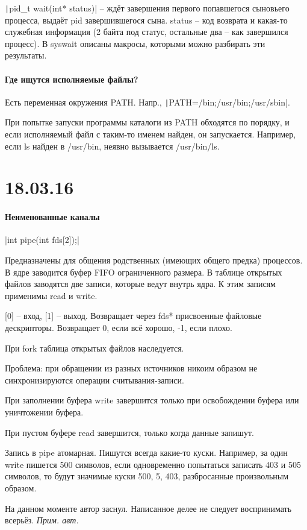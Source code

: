 \documentclass[a4paper,10pt]{article}
\newcommand{\cl}{\mint{c}}
\newcommand{\bash}{\texttt}
\begin{document}
\texttt|pid_t wait(int* status)| -- ждёт завершения первого попавшегося сыновьего процесса, выдаёт pid завершившегося сына. status -- код возврата и какая-то служебная информация (2 байта под статус, остальные два -- как завершился процесс). В syswait описаны макросы, которыми можно разбирать эти результаты.

\paragraph{Где ищутся исполняемые файлы?}
Есть переменная окружения PATH. Напр., \bash|PATH=/bin;/usr/bin;/usr/sbin|. 

При попытке запуски программы каталоги из PATH обходятся по порядку, и если исполняемый файл с таким-то именем найден, он запускается. 
Например, если ls найден в /usr/bin, неявно вызывается /usr/bin/ls.

\section{18.03.16}
\paragraph{Неименованные каналы}
\cl|int pipe(int fds[2]);|

Предназначены для общения родственных (имеющих общего предка) процессов.
В ядре заводится буфер FIFO ограниченного размера. В таблице открытых файлов заводятся две записи, которые ведут внутрь ядра. К этим записям применимы read и write.

[0] -- вход, [1] -- выход. Возвращает через fds* присвоенные файловые дескрипторы. Возвращает 0, если всё хорошо, -1, если плохо.

При fork таблица открытых файлов наследуется.

Проблема: при обращении из разных источников никоим образом не синхронизируются операции считывания-записи.

При заполнении буфера write завершится только при освобождении буфера или уничтожении буфера.

При пустом буфере read завершится, только когда данные запишут.

Запись в pipe атомарная. Пишутся всегда какие-то куски. Например, за один write пишется 500 символов, если одновременно попытаться записать 403 и 505 символов, то будут значимые куски 500, 5, 403, разбросанные произвольным образом.

На данном моменте автор заснул. Написанное делее не следует воспринимать всерьёз.
\textit{Прим. авт.}
\end{document}
